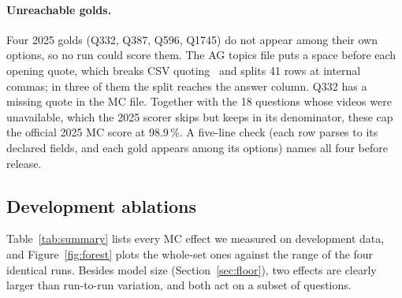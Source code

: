 \documentclass[sigconf,nonacm]{acmart}
\begin{document}
\paragraph{Unreachable golds.}
Four 2025 golds (Q332, Q387, Q596, Q1745) do not appear among their own options,
so no run could score them. The AG topics file puts a space before each opening
quote, which breaks CSV quoting~\cite{rfc4180} and splits 41 rows at internal
commas; in three of them the split reaches the answer column. Q332 has a missing
quote in the MC file. Together with the 18 questions whose videos were
unavailable, which the 2025 scorer skips but keeps in its denominator, these cap
the official 2025 MC score at 98.9\,\%. A five-line check (each row parses to its
declared fields, and each gold appears among its options) names all four before
release.

\subsection{Development ablations}
\label{sec:negatives}

Table~\ref{tab:summary} lists every MC effect we measured on development data,
and Figure~\ref{fig:forest} plots the whole-set ones against the range of the
four identical runs. Besides model size (Section~\ref{sec:floor}), two effects
are clearly larger than run-to-run variation, and both act on a subset of
questions.
\end{document}
